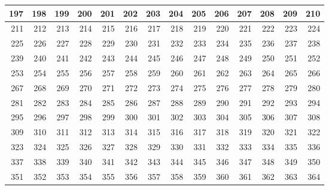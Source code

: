 \documentclass[a4paper, 17pt]{extarticle}       %
\begin{document}
\begin{tabular}{|r|r|r|r|r|r|r|r|r|r|r|r|r|r|}
197  &  198  &  199  &  200  &  201  &  202  &  203  &  204  &  205  &  206  &  207  &  208  &  209  &  210  \\ \hline
211  &  212  &  213  &  214  &  215  &  216  &  217  &  218  &  219  &  220  &  221  &  222  &  223  &  224  \\ \hline
225  &  226  &  227  &  228  &  229  &  230  &  231  &  232  &  233  &  234  &  235  &  236  &  237  &  238  \\ \hline
239  &  240  &  241  &  242  &  243  &  244  &  245  &  246  &  247  &  248  &  249  &  250  &  251  &  252  \\ \hline
253  &  254  &  255  &  256  &  257  &  258  &  259  &  260  &  261  &  262  &  263  &  264  &  265  &  266  \\ \hline
267  &  268  &  269  &  270  &  271  &  272  &  273  &  274  &  275  &  276  &  277  &  278  &  279  &  280  \\ \hline
281  &  282  &  283  &  284  &  285  &  286  &  287  &  288  &  289  &  290  &  291  &  292  &  293  &  294  \\ \hline
295  &  296  &  297  &  298  &  299  &  300  &  301  &  302  &  303  &  304  &  305  &  306  &  307  &  308  \\ \hline
309  &  310  &  311  &  312  &  313  &  314  &  315  &  316  &  317  &  318  &  319  &  320  &  321  &  322  \\ \hline
323  &  324  &  325  &  326  &  327  &  328  &  329  &  330  &  331  &  332  &  333  &  334  &  335  &  336  \\ \hline
337  &  338  &  339  &  340  &  341  &  342  &  343  &  344  &  345  &  346  &  347  &  348  &  349  &  350  \\ \hline
351  &  352  &  353  &  354  &  355  &  356  &  357  &  358  &  359  &  360  &  361  &  362  &  363  &  364  \\ \hline
\end{tabular}
\end{document}
